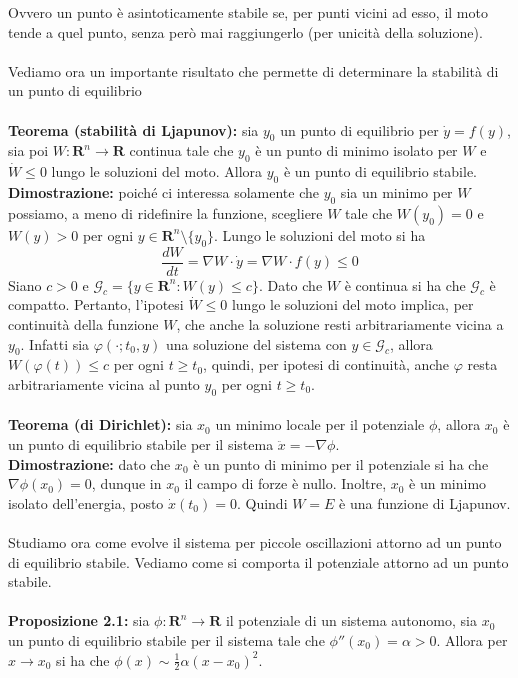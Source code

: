 \documentclass{article}
\begin{document}
Ovvero un punto è asintoticamente stabile se, per punti vicini ad esso, il moto tende a quel punto, senza però mai raggiungerlo (per unicità della soluzione). \\ \\
Vediamo ora un importante risultato che permette di determinare la stabilità di un punto di equilibrio \\ \\
\textbf{Teorema (stabilità di Ljapunov):} sia $y_0$ un punto di equilibrio per $\dot{y} = f(y)$, sia poi $W : \mathbf{R}^n \longrightarrow \mathbf{R}$ continua tale che $y_0$ è un punto di minimo isolato per $W$ e $\dot{W} \leq 0$ lungo le soluzioni del moto. Allora $y_0$ è un punto di equilibrio stabile. \\

\textbf{Dimostrazione:} poiché ci interessa solamente che $y_0$ sia un minimo per $W$ possiamo, a meno di ridefinire la funzione, scegliere $W$ tale che $W(y_0) = 0$ e $W(y) > 0$ per ogni $y \in \mathbf{R}^n \setminus \{y_0\}$. Lungo le soluzioni del moto si ha
\begin{equation}
    \frac{dW}{dt} = \nabla W \cdot \dot{y} = \nabla W \cdot f(y) \leq 0 \tag{2.4}
\end{equation}
Siano $c > 0$ e $\mathcal{G}_c = \{ y \in \mathbf{R}^n : W(y) \leq c \}$. Dato che $W$ è continua si ha che $\mathcal{G}_c$ è compatto. Pertanto, l'ipotesi $\dot{W} \leq 0$ lungo le soluzioni del moto implica, per continuità della funzione $W$, che anche la soluzione resti arbitrariamente vicina a $y_0$. Infatti sia $\varphi(\cdot; t_0, y)$ una soluzione del sistema con $y \in \mathcal{G}_c$, allora $W(\varphi(t)) \leq c$ per ogni $t \geq t_0$, quindi, per ipotesi di continuità, anche $\varphi$ resta arbitrariamente vicina al punto $y_0$ per ogni $t \geq t_0$. \\ \\
\textbf{Teorema (di Dirichlet):} sia $x_0$ un minimo locale per il potenziale $\phi$, allora $x_0$ è un punto di equilibrio stabile per il sistema $\ddot{x} = -\nabla \phi$. \\

\textbf{Dimostrazione:} dato che $x_0$ è un punto di minimo per il potenziale si ha che $\nabla \phi (x_0) = 0$, dunque in $x_0$ il campo di forze è nullo. Inoltre, $x_0$ è un minimo isolato dell'energia, posto $\dot{x}(t_0) = 0$. Quindi $W = E$ è una funzione di Ljapunov. \\ \\
Studiamo ora come evolve il sistema per piccole oscillazioni attorno ad un punto di equilibrio stabile. Vediamo come si comporta il potenziale attorno ad un punto stabile. \\ \\
\textbf{Proposizione 2.1:} sia $\phi : \mathbf{R}^n \longrightarrow \mathbf{R}$ il potenziale di un sistema autonomo, sia $x_0$ un punto di equilibrio stabile per il sistema tale che $\phi''(x_0) = \alpha > 0$. Allora per $x \rightarrow x_0$ si ha che $\phi(x) \sim \frac{1}{2}\alpha(x - x_0)^2$. \\
\end{document}
